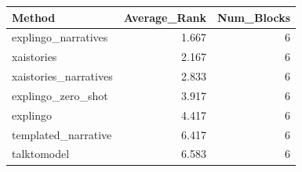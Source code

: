 \begin{tabular}{lrr}
\toprule
Method & Average_Rank & Num_Blocks \\
\midrule
explingo_narratives & 1.667 & 6 \\
xaistories & 2.167 & 6 \\
xaistories_narratives & 2.833 & 6 \\
explingo_zero_shot & 3.917 & 6 \\
explingo & 4.417 & 6 \\
templated_narrative & 6.417 & 6 \\
talktomodel & 6.583 & 6 \\
\bottomrule
\end{tabular}

